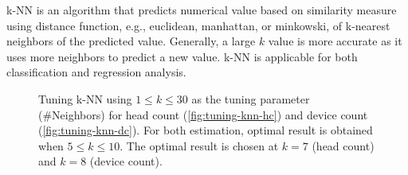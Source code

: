 	\ac{k-NN} is an algorithm that predicts numerical value based on similarity measure using distance function, e.g., euclidean, manhattan, or minkowski, of k-nearest neighbors of the predicted value. Generally, a large $k$ value is more accurate as it uses more neighbors to predict a new value. \ac{k-NN} is applicable for both classification and regression analysis.

	\begin{figure}[h]
		\begin{adjustwidth}{-1cm}{}
		\centering
		\end{adjustwidth}
		\caption{Tuning \ac{k-NN} using $1 \le k \le 30$ as the tuning parameter (\#Neighbors) for head count (\ref{fig:tuning-knn-hc}) and device count (\ref{fig:tuning-knn-dc}). For both estimation, optimal result is obtained when $5 \le k \le 10$. The optimal result is chosen at $k=7$ (head count) and $k=8$ (device count).}
		\label{fig:tuning-knn}
	\end{figure}

